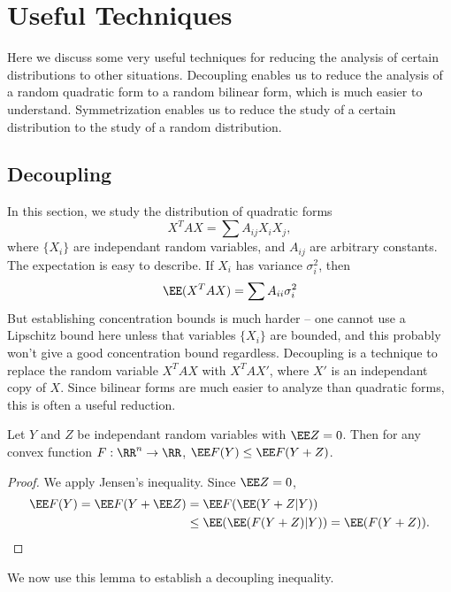 \chapter{Useful Techniques}

Here we discuss some very useful techniques for reducing the analysis of certain distributions to other situations. Decoupling enables us to reduce the analysis of a random quadratic form to a random bilinear form, which is much easier to understand. Symmetrization enables us to reduce the study of a certain distribution to the study of a random distribution.

\section{Decoupling}

In this section, we study the distribution of quadratic forms
%
\[ X^T A X = \sum A_{ij} X_i X_j, \]
%
where $\{ X_i \}$ are independant random variables, and $A_{ij}$ are arbitrary constants. The expectation is easy to describe. If $X_i$ has variance $\sigma_i^2$, then
%
\[ \EE(X^T A X) = \sum A_{ii} \sigma_i^2 \]
%
But establishing concentration bounds is much harder -- one cannot use a Lipschitz bound here unless that variables $\{ X_i \}$ are bounded, and this probably won't give a good concentration bound regardless. Decoupling is a technique to replace the random variable $X^T AX$ with $X^T A X'$, where $X'$ is an independant copy of $X$. Since bilinear forms are much easier to analyze than quadratic forms, this is often a useful reduction.

\begin{lemma}
    Let $Y$ and $Z$ be independant random variables with $\EE Z = 0$. Then for any convex function $F: \RR^n \to \RR$, $\EE F(Y) \leq \EE F(Y+Z)$.
\end{lemma}
\begin{proof}
    We apply Jensen's inequality. Since $\EE Z = 0$,
    \begin{align*}
        \EE F(Y) = \EE F(Y + \EE Z) &= \EE F(\EE(Y + Z|Y))\\
        &\leq \EE(\EE(F(Y+Z)|Y)) = \EE(F(Y+Z)). \qedhere
    \end{align*}
\end{proof}

We now use this lemma to establish a decoupling inequality.

